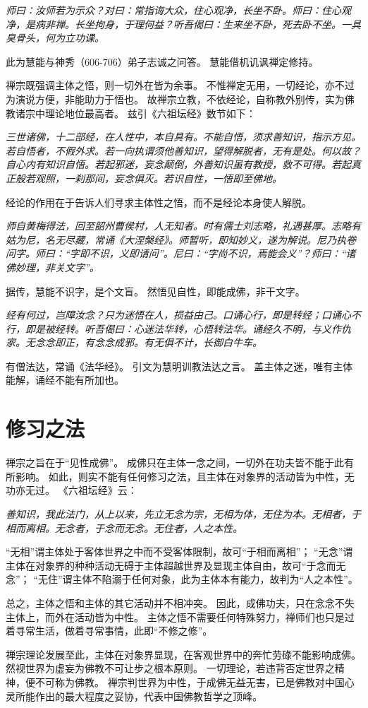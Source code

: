 \documentclass[11pt]{article}
\begin{document}
\textit{师曰：汝师若为示众？对曰：常指诲大众，住心观净，长坐不卧。师曰：住心观净，是病非禅。长坐拘身，于理何益？听吾偈曰：生来坐不卧，死去卧不坐。一具臭骨头，何为立功课。}

此为慧能与神秀（606-706）弟子志诚之问答。
慧能借机讥讽禅定修持。

\par

禅宗既强调主体之悟，则一切外在皆为余事。
不惟禅定无用，一切经论，亦不过为演说方便，非能助力于悟也。
故禅宗立教，不依经论，自称教外别传，实为佛教诸宗中理论地位最高者。
兹引《六祖坛经》数节如下：

\textit{三世诸佛，十二部经，在人性中，本自具有。不能自悟，须求善知识，指示方见。若自悟者，不假外求。若一向执谓须他善知识，望得解脱者，无有是处。何以故？自心内有知识自悟。若起邪迷，妄念颠倒，外善知识虽有教授，救不可得。若起真正般若观照，一刹那间，妄念俱灭。若识自性，一悟即至佛地。}

经论的作用在于告诉人们寻求主体性之悟，而不是经论本身使人解脱。

\textit{师自黄梅得法，回至韶州曹侯村，人无知者。时有儒士刘志略，礼遇甚厚。志略有姑为尼，名无尽藏，常诵《大涅槃经》。师暂听，即知妙义，遂为解说。尼乃执卷问字。师曰：“字即不识，义即请问”。尼曰：“字尚不识，焉能会义”？师曰：“诸佛妙理，非关文字”。}

据传，慧能不识字，是个文盲。
然悟见自性，即能成佛，非干文字。

\textit{经有何过，岂障汝念？只为迷悟在人，损益由己。口诵心行，即是转经；口诵心不行，即是被经转。听吾偈曰：心迷法华转，心悟转法华。诵经久不明，与义作仇家。无念念即正，有念念成邪。有无俱不计，长御白牛车。}

有僧法达，常诵《法华经》。
引文为慧明训教法达之言。
盖主体之迷，唯有主体能解，诵经不能有所加也。

\section{修习之法}
禅宗之旨在于“见性成佛”。
成佛只在主体一念之间，一切外在功夫皆不能于此有所影响。
如此，则实不能有任何修习之法，且主体在对象界的活动皆为中性，无功亦无过。
《六祖坛经》云：

\textit{善知识，我此法门，从上以来，先立无念为宗，无相为体，无住为本。无相者，于相而离相。无念者，于念而无念。无住者，人之本性。}

“无相”谓主体处于客体世界之中而不受客体限制，故可“于相而离相”；
“无念”谓主体在对象界的种种活动无碍于主体超越世界及显现主体自由，故可“于念而无念”；
“无住”谓主体不陷溺于任何对象，此为主体本有能力，故判为“人之本性”。

\par

总之，主体之悟和主体的其它活动并不相冲突。
因此，成佛功夫，只在念念不失主体上，而外在活动皆为中性。
主体之悟不需要任何特殊努力，禅师们也只是过着寻常生活，做着寻常事情，此即“不修之修”。

\par

禅宗理论发展至此，主体在对象界显现，在客观世界中的奔忙劳碌不能影响成佛。
然视世界为虚妄为佛教不可让步之根本原则。
一切理论，若违背否定世界之精神，便不可称为佛教。
禅宗判世界为中性，于成佛无益无害，已是佛教对中国心灵所能作出的最大程度之妥协，代表中国佛教哲学之顶峰。
  
\end{document}
